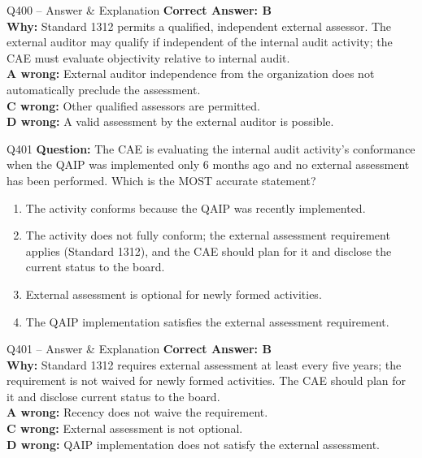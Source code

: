 \documentclass[aspectratio=169,10pt]{beamer}
\begin{document}
	\begin{frame}[t]{Q400 -- Answer \& Explanation}
		\small
		\textbf{Correct Answer: B} \\[4pt]
		\textbf{Why:} Standard 1312 permits a qualified, independent external assessor. The external auditor may qualify if independent of the internal audit activity; the CAE must evaluate objectivity relative to internal audit. \\[4pt]
		\textbf{A wrong:} External auditor independence from the organization does not automatically preclude the assessment. \\[2pt]
		\textbf{C wrong:} Other qualified assessors are permitted. \\[2pt]
		\textbf{D wrong:} A valid assessment by the external auditor is possible.
	\end{frame}
	
	\begin{frame}[t]{Q401}
		\small
		\textbf{Question:} The CAE is evaluating the internal audit activity's conformance when the QAIP was implemented only 6 months ago and no external assessment has been performed. Which is the MOST accurate statement?
		\begin{enumerate}[label=\Alph*.,itemsep=1pt,topsep=2pt]
			\item The activity conforms because the QAIP was recently implemented.
			\item The activity does not fully conform; the external assessment requirement applies (Standard 1312), and the CAE should plan for it and disclose the current status to the board.
			\item External assessment is optional for newly formed activities.
			\item The QAIP implementation satisfies the external assessment requirement.
		\end{enumerate}
	\end{frame}
	
	\begin{frame}[t]{Q401 -- Answer \& Explanation}
		\small
		\textbf{Correct Answer: B} \\[4pt]
		\textbf{Why:} Standard 1312 requires external assessment at least every five years; the requirement is not waived for newly formed activities. The CAE should plan for it and disclose current status to the board. \\[4pt]
		\textbf{A wrong:} Recency does not waive the requirement. \\[2pt]
		\textbf{C wrong:} External assessment is not optional. \\[2pt]
		\textbf{D wrong:} QAIP implementation does not satisfy the external assessment.
	\end{frame}
	
\end{document}
